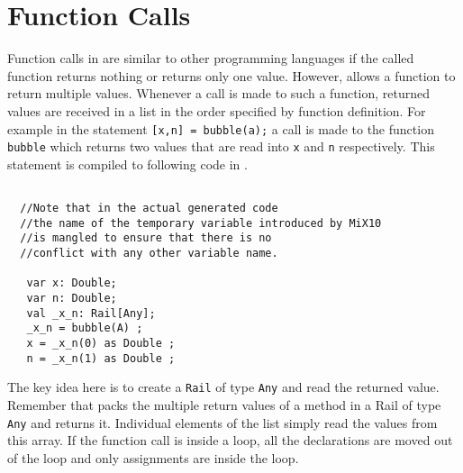 %
   
\section{Function Calls}

Function calls in \matlab are similar to other programming languages if
the called function returns nothing or returns only one value. However,
\matlab allows a function to return multiple values.
Whenever a call is made to such a function, returned values are received
in a list in the order specified by function definition. For example in
the statement \verb|[x,n] = bubble(a);| a call is made to the function
\verb|bubble| which returns two values that are read into \verb|x| and
\verb|n| respectively. This statement is compiled to following code in
\xten.

\begin{lstlisting}[language=X10,numbers=none]
  
  //Note that in the actual generated code
  //the name of the temporary variable introduced by MiX10
  //is mangled to ensure that there is no 
  //conflict with any other variable name. 
  
   var x: Double;
   var n: Double;
   val _x_n: Rail[Any];
   _x_n = bubble(A) ;
   x = _x_n(0) as Double ;
   n = _x_n(1) as Double ;
\end{lstlisting}

The key idea here is to create a \texttt{Rail} of type \verb|Any| and read the
returned value. Remember that \mixten packs the multiple return values
of a method in a Rail of type \verb|Any| and returns it.  Individual
elements of the list simply read the values from this array. If the
function call is inside a loop, all the declarations are moved out of
the loop and only assignments are inside the loop. 

